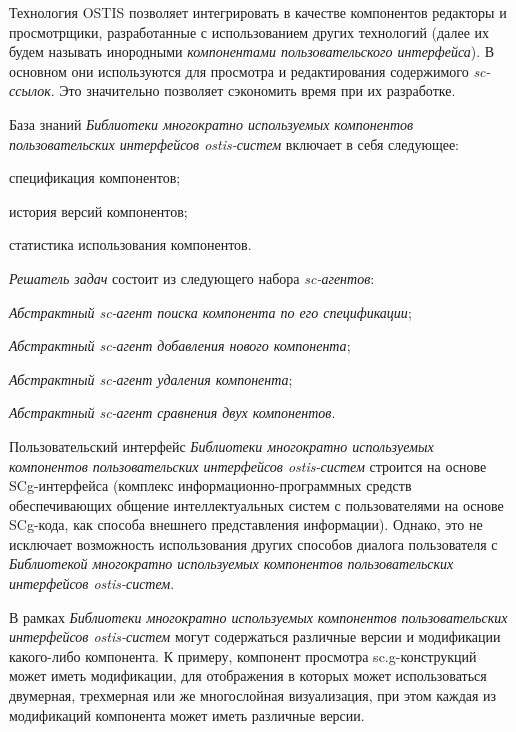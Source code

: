 Технология OSTIS позволяет интегрировать в качестве компонентов редакторы и просмотрщики, разработанные с использованием других технологий (далее их будем называть инородными \textit{компонентами пользовательского интерфейса}). В основном они используются для просмотра и редактирования содержимого \textit{sc-ссылок}. Это значительно позволяет сэкономить время при их разработке.

База знаний \textit{Библиотеки многократно используемых компонентов пользовательских интерфейсов ostis-систем} включает в себя следующее:
\begin{textitemize}
	\item спецификация компонентов;
	\item история версий компонентов;
	\item статистика использования компонентов.
\end{textitemize}

\textit{Решатель задач} состоит из следующего набора \textit{sc-агентов}:
\begin{textitemize}
	\item \textit{Абстрактный sc-агент поиска компонента по его спецификации};
	\item \textit{Абстрактный sc-агент добавления нового компонента};
	\item \textit{Абстрактный sc-агент удаления компонента};
	\item \textit{Абстрактный sc-агент сравнения двух компонентов}.
\end{textitemize}

Пользовательский интерфейс \textit{Библиотеки многократно используемых компонентов пользовательских интерфейсов ostis-систем} строится на основе SCg-интерфейса
(комплекс информационно-программных средств обеспечивающих общение интеллектуальных
систем с пользователями на основе SCg-кода, как способа внешнего представления
информации). Однако, это не исключает возможность использования других способов диалога пользователя с \textit{Библиотекой многократно используемых компонентов пользовательских интерфейсов ostis-систем}.

В рамках \textit{Библиотеки многократно используемых компонентов пользовательских интерфейсов ostis-систем} могут содержаться различные версии и модификации
какого-либо компонента. К примеру, компонент просмотра sc.g-конструкций может иметь
модификации, для отображения в которых может использоваться двумерная, трехмерная или
же многослойная визуализация, при этом каждая из модификаций компонента может иметь
различные версии.

